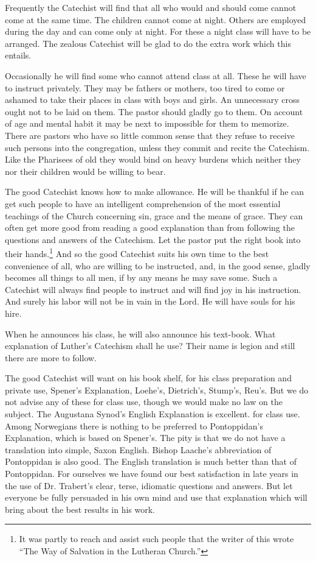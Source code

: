 Frequently the Catechist will find that all who would and should come cannot come at the same time. The children cannot come at night. Others are employed during the day and can come only at night. For these a night class will have to be arranged. The zealous Catechist will be glad to do the extra work which this entails.

Occasionally he will find some who cannot attend class at all. These he will have to instruct privately. They may be fathers or mothers, too tired to come or ashamed to take their places in class with boys and girls. An unnecessary cross ought not to be laid on them. The pastor should gladly go to them. On account of age and mental habit it may be next to impossible for them to memorize. There are pastors who have so little common sense that they refuse to receive such persons into the congregation, unless they commit and recite the Catechism. Like the Pharisees of old they would bind on heavy burdens which neither they nor their children would be willing to bear.

The good Catechist knows how to make allowance. He will be thankful if he can get such people to have an intelligent comprehension of the most essential teachings of the Church concerning sin, grace and the means of grace. They can often get more good from reading a good explanation than from following the questions and answers of the Catechism. Let the pastor put the right book into their hands.\footnote{It was partly to reach and assist such people that the writer of this wrote “The Way of Salvation in the Lutheran Church.”} And so the good Catechist suits his own time to the best convenience of all, who are willing to be instructed, and, in the good sense, gladly becomes all things to all men, if by any means he may save some. Such a Catechist will always find people to instruct and will find joy in his instruction. And surely his labor will not be in vain in the Lord. He will have souls for his hire.

When he announces his class, he will also announce his text-book. What explanation of Luther’s Catechism shall he use? Their name is legion and still there are more to follow.

The good Catechist will want on his book shelf, for his class preparation and private use, Spener’s Explanation, Loehe’s, Dietrich’s, Stump’s, Reu’s. But we do not advise any of these for class use, though we would make no law on the subject. The Augustana Synod’s English Explanation is excellent.
for class use. Among Norwegians there is nothing to be preferred to Pontoppidan’s Explanation, which is based on Spener’s. The pity is that we do not have a translation into simple, Saxon English. Bishop Laache’s abbreviation of Pontoppidan is also good. The English translation is much better than that of Pontoppidan. For ourselves we have found our best satisfaction in late years in the use of Dr. Trabert’s clear, terse, idiomatic questions and answers. But let everyone be fully persuaded in his own mind and use that explanation which will bring about the best results in his work.

